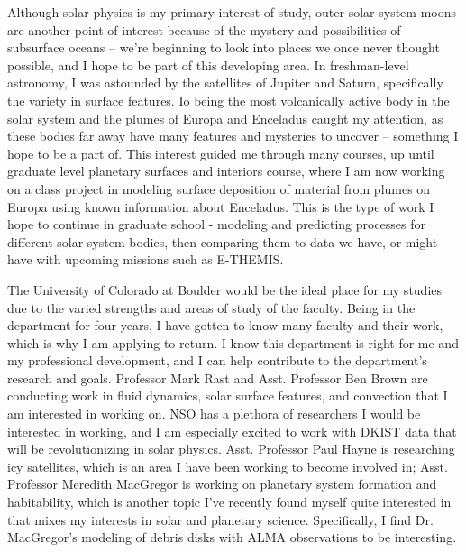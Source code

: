 \documentclass[11pt,letterpaper]{article}
\begin{document}
Although solar physics is my primary interest of study, outer solar system moons are another point of interest because of the mystery and possibilities of subsurface oceans -- we’re beginning to look into places we once never thought possible, and I hope to be part of this developing area. In freshman-level astronomy, I was astounded by the satellites of Jupiter and Saturn, specifically the variety in surface features. Io being the most volcanically active body in the solar system and the plumes of Europa and Enceladus caught my attention, as these bodies far away have many features and mysteries to uncover -- something I hope to be a part of. This interest guided me through many courses, up until graduate level planetary surfaces and interiors course, where I am now working on a class project in modeling surface deposition of material from plumes on Europa using known information about Enceladus. This is the type of work I hope to continue in graduate school - modeling and predicting processes for different solar system bodies, then comparing them to data we have, or might have with upcoming missions such as E-THEMIS.

The University of Colorado at Boulder would be the ideal place for my studies due to the varied strengths and areas of study of the faculty. Being in the department for four years, I have gotten to know many faculty and their work, which is why I am applying to return. I know this department is right for me and my professional development, and I can help contribute to the department's research and goals. Professor Mark Rast and Asst. Professor Ben Brown are conducting work in fluid dynamics, solar surface features, and convection that I am interested in working on. NSO has a plethora of researchers I would be interested in working, and I am especially excited to work with DKIST data that will be revolutionizing in solar physics. Asst. Professor Paul Hayne is researching icy satellites, which is an area I have been working to become involved in; Asst. Professor Meredith MacGregor is working on planetary system formation and habitability, which is another topic I've recently found myself quite interested in that mixes my interests in solar and planetary science. Specifically, I find Dr. MacGregor's modeling of debris disks with ALMA observations to be interesting. 
 
\pagebreak
 
\end{document}

